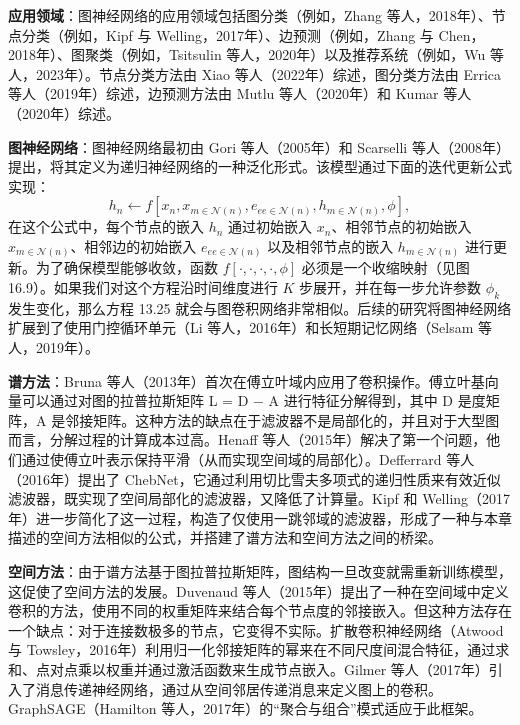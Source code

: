 \documentclass[lang=cn,newtx,10pt,scheme=chinese]{elegantbook}
\begin{document}
\textbf{应用领域}：图神经网络的应用领域包括图分类（例如，Zhang 等人，2018年）、节点分类（例如，Kipf 与 Welling，2017年）、边预测（例如，Zhang 与 Chen，2018年）、图聚类（例如，Tsitsulin 等人，2020年）以及推荐系统（例如，Wu 等人，2023年）。节点分类方法由 Xiao 等人（2022年）综述，图分类方法由 Errica 等人（2019年）综述，边预测方法由 Mutlu 等人（2020年）和 Kumar 等人（2020年）综述。

\textbf{图神经网络}：图神经网络最初由 Gori 等人（2005年）和 Scarselli 等人（2008年）提出，将其定义为递归神经网络的一种泛化形式。该模型通过下面的迭代更新公式实现：
\begin{equation}
h_n \leftarrow f \left[ x_n, x_{m\in \mathcal{N}(n)}, e_{ee\in \mathcal{N}(n)}, h_{m\in \mathcal{N}(n)}, \phi \right], 
\end{equation}
在这个公式中，每个节点的嵌入 \(h_n\) 通过初始嵌入 \(x_n\)、相邻节点的初始嵌入 \(x_{m\in \mathcal{N}(n)}\)、相邻边的初始嵌入 \(e_{ee\in \mathcal{N}(n)}\) 以及相邻节点的嵌入 \(h_{m\in \mathcal{N}(n)}\) 进行更新。为了确保模型能够收敛，函数 \(f[\cdot, \cdot, \cdot, \cdot, \phi]\) 必须是一个收缩映射（见图 16.9）。如果我们对这个方程沿时间维度进行 \(K\) 步展开，并在每一步允许参数 \(\phi_k\) 发生变化，那么方程 13.25 就会与图卷积网络非常相似。后续的研究将图神经网络扩展到了使用门控循环单元（Li 等人，2016年）和长短期记忆网络（Selsam 等人，2019年）。

\textbf{谱方法}：Bruna 等人（2013年）首次在傅立叶域内应用了卷积操作。傅立叶基向量可以通过对图的拉普拉斯矩阵 L = D − A 进行特征分解得到，其中 D 是度矩阵，A 是邻接矩阵。这种方法的缺点在于滤波器不是局部化的，并且对于大型图而言，分解过程的计算成本过高。Henaff 等人（2015年）解决了第一个问题，他们通过使傅立叶表示保持平滑（从而实现空间域的局部化）。Defferrard 等人（2016年）提出了 ChebNet，它通过利用切比雪夫多项式的递归性质来有效近似滤波器，既实现了空间局部化的滤波器，又降低了计算量。Kipf 和 Welling（2017年）进一步简化了这一过程，构造了仅使用一跳邻域的滤波器，形成了一种与本章描述的空间方法相似的公式，并搭建了谱方法和空间方法之间的桥梁。

\textbf{空间方法}：由于谱方法基于图拉普拉斯矩阵，图结构一旦改变就需重新训练模型，这促使了空间方法的发展。Duvenaud 等人（2015年）提出了一种在空间域中定义卷积的方法，使用不同的权重矩阵来结合每个节点度的邻接嵌入。但这种方法存在一个缺点：对于连接数极多的节点，它变得不实际。扩散卷积神经网络（Atwood 与 Towsley，2016年）利用归一化邻接矩阵的幂来在不同尺度间混合特征，通过求和、点对点乘以权重并通过激活函数来生成节点嵌入。Gilmer 等人（2017年）引入了消息传递神经网络，通过从空间邻居传递消息来定义图上的卷积。GraphSAGE（Hamilton 等人，2017年）的“聚合与组合”模式适应于此框架。
\end{document}
